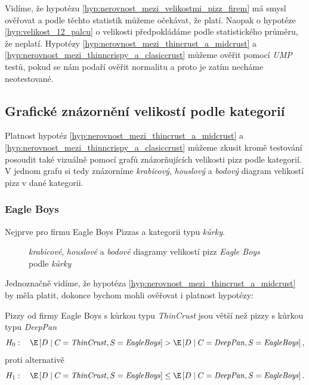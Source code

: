 Vidíme, že hypotézu \ref{hyp:nerovnost_mezi_velikostmi_pizz_firem} má smysl ověřovat a podle těchto
statistik můžeme očekávat, že platí. Naopak o hypotéze \ref{hyp:velikost_12_palcu} o velikosti
předpokládáme podle statistického průměru, že neplatí. Hypotézy
\ref{hyp:nerovnost_mezi_thincrust_a_midcrust} a \ref{hyp:nerovnost_mezi_thinncrispy_a_clasiccrust}
můžeme ověřit pomocí \emph{UMP} testů, pokud se nám podaří ověřit normalitu a proto je zatím necháme
neotestované.

\subsection{Grafické znázornění velikostí podle kategorií}%
\label{sub:graficke_znazorneni_velikosti_podle_kategorii}
Platnost hypotéz \ref{hyp:nerovnost_mezi_thincrust_a_midcrust} a
\ref{hyp:nerovnost_mezi_thinncrispy_a_clasiccrust} můžeme zkusit kromě testování
posoudit také vizuálně pomocí grafů znázorňujících velikosti pizz podle kategorií.
V jednom grafu si tedy znázorníme \emph{krabicový},
\emph{houslový} a \emph{bodový} diagram velikostí pizz v dané kategorii.

\subsubsection*{Eagle Boys}%
\label{ssub:graficke_znazorneni_eagle_boys}

Nejprve pro firmu
Eagle Boys Pizzas a kategorii typu \emph{kůrky}.

\begin{figure}[H]
	\centering
	\label{fig:eagleboys_crust_diagrams}
	
	\caption{\emph{krabicové}, \emph{houslové} a \emph{bodové} diagramy velikostí pizz \emph{Eagle Boys} podle \emph{kůrky}}
\end{figure}

\noindent Jednoznačně vidíme, že hypotéza \ref{hyp:nerovnost_mezi_thincrust_a_midcrust} by měla
platit, dokonce bychom mohli ověřovat i platnost hypotézy:

\begin{hypothesis}
	\label{hyp:nerovnost_mezi_thincrust_a_deeppan}
	Pizzy od firmy Eagle Boys s kůrkou typu \emph{ThinCrust} jsou větší než pizzy s kůrkou typu \emph{DeepPan}
	\[
		H_0: \quad \E\left[D \mid C = \text{\emph{ThinCrust}}, S = \text{\emph{EagleBoys}} \right] >
		\E\left[ D \mid C = \text{\emph{DeepPan}}, S = \text{\emph{EagleBoys}}\right],
	\]
	proti alternativě
	\[
		H_1: \quad \E\left[D \mid C = \text{\emph{ThinCrust}}, S = \text{\emph{EagleBoys}} \right]
		\le
		\E\left[ D \mid C = \text{\emph{DeepPan}}, S = \text{\emph{EagleBoys}}\right].
	\]
\end{hypothesis}

